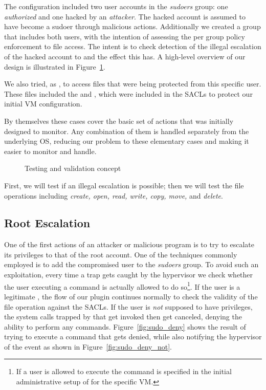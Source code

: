 \par The configuration included two user accounts in the \emph{sudoers} group: one \emph{authorized} and one hacked by an \emph{attacker}. The hacked account is assumed to have become a sudoer through malicious actions. Additionally we created a group that includes both users, with the intention of assessing the per group policy enforcement to file access. The intent is to check detection of the illegal escalation of the hacked account to  and the effect this has. A high-level overview of our design is illustrated in Figure~\ref{fig:attack}. 

\par We also tried, as , to access files that were being protected from this specific user. These files included the  and , which were included in the \acp{SACL} to protect our initial \ac{VM} configuration.

\par By themselves these cases cover the basic set of actions that  was initially designed to monitor. Any combination of them is handled separately from the underlying \ac{OS}, reducing our problem to these elementary cases and making it easier to monitor and handle.

\begin{figure}[ht]
	\centering
	
	\caption{Testing and validation concept}
	\label{fig:attack}
\end{figure} 

\par First, we will test if an illegal  escalation is possible; then we will test the file operations including \emph{create, open, read, write, copy, move,} and \emph{delete}.

\subsection{Root Escalation}

\par One of the first actions of an attacker or malicious program is to try to escalate its privileges to that of the root account. One of the techniques commonly employed is to add the compromised user to the \emph{sudoers} group. To avoid such an exploitation, every time a trap gets caught by the hypervisor we check whether the user executing a  command is actually allowed to do so\footnote{If a user is allowed to execute the  command is specified in the initial administrative setup of  for the specific \ac{VM}.}. If the user is a legitimate , the flow of our plugin continues normally to check the validity of the file operation against the \acp{SACL}. If the user is \emph{not} supposed to have  privileges, the system calls trapped by  that get invoked then get canceled, denying the ability to perform any  commands. Figure~\ref{fig:sudo_deny} shows the result of trying to execute a  command that gets denied, while also notifying the hypervisor of the event as shown in Figure~\ref{fig:sudo_deny_not}.

